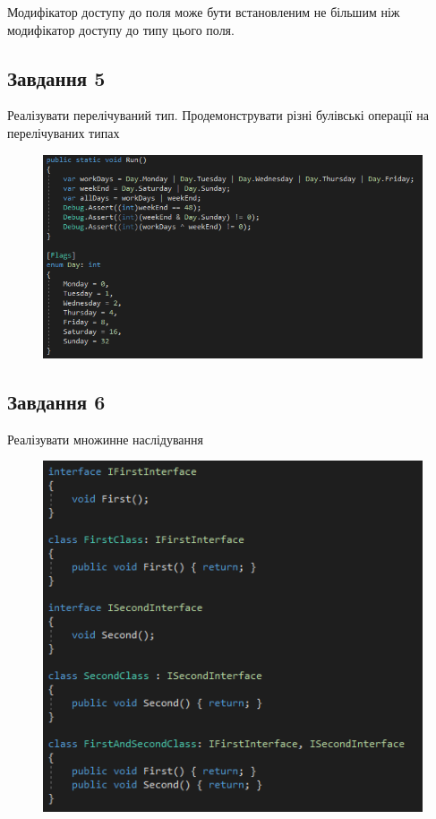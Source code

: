 \documentclass[oneside,14pt]{extarticle}
\begin{document}
\begin{normalsize}
	Модифікатор доступу до поля може бути встановленим не більшим ніж модифікатор доступу до типу цього поля.
	
	\subsection*{Завдання 5}
	Реалізувати перелічуваний тип. Продемонструвати різні булівські операції на
	перелічуваних типах
	\begin{figure}[H]
		\centering
		\includegraphics[scale=0.7]{15}
	\end{figure}
	
	\subsection*{Завдання 6}
	Реалізувати множинне наслідування
	\begin{figure}[H]
		\centering
		\includegraphics[scale=0.7]{16}
	\end{figure}


\end{normalsize}
\end{document}
